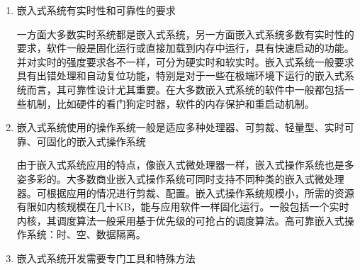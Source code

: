 \begin{enumerate}
\item 嵌{\cf}入式{\cf}系统{\cf}有实{\cf}时性{\cf}和可{\cf}靠性{\cf}的要{\cf}求

一{\cf}方面{\cf}大多{\cf}数实{\cf}时系{\cf}统都{\cf}是嵌{\cf}入式{\cf}系统{\cf}，另{\cf}一方{\cf}面嵌{\cf}入式{\cf}系统{\cf}多数{\cf}有实{\cf}时性{\cf}的要{\cf}求，{\cf}软件{\cf}一般{\cf}是固{\cf}化运{\cf}行或{\cf}直接{\cf}加载{\cf}到内{\cf}存中{\cf}运行{\cf}，具{\cf}有快{\cf}速启{\cf}动的{\cf}功能{\cf}。并{\cf}对实{\cf}时的{\cf}强度{\cf}要求{\cf}各不{\cf}一样{\cf}，可{\cf}分为{\cf}硬实{\cf}时和{\cf}软实{\cf}时。{\cf}嵌入{\cf}式系{\cf}统一{\cf}般要{\cf}求具{\cf}有出{\cf}错处{\cf}理和{\cf}自动{\cf}复位{\cf}功能{\cf}，特{\cf}别是{\cf}对于{\cf}一些{\cf}在极{\cf}端环{\cf}境下{\cf}运行{\cf}的嵌{\cf}入式{\cf}系统{\cf}而言{\cf}，其{\cf}可靠{\cf}性设{\cf}计尤{\cf}其重{\cf}要。{\cf}在大{\cf}多数{\cf}嵌入{\cf}式系{\cf}统的{\cf}软件{\cf}中一{\cf}般都{\cf}包括{\cf}一些{\cf}机制{\cf}，比{\cf}如硬{\cf}件的{\cf}看门{\cf}狗定{\cf}时器{\cf}，软{\cf}件的{\cf}内存{\cf}保护{\cf}和重{\cf}启动{\cf}机制{\cf}。

\item 嵌{\cf}入式{\cf}系统{\cf}使用{\cf}的操{\cf}作系{\cf}统一{\cf}般是{\cf}适应{\cf}多种{\cf}处理{\cf}器、{\cf}可剪{\cf}裁、{\cf}轻量{\cf}型、{\cf}实时{\cf}可靠{\cf}、可{\cf}固化{\cf}的嵌{\cf}入式{\cf}操作{\cf}系统{\cf}

由{\cf}于嵌{\cf}入式{\cf}系统{\cf}应用{\cf}的特{\cf}点，{\cf}像嵌{\cf}入式{\cf}微处{\cf}理器{\cf}一样{\cf}，嵌{\cf}入式{\cf}操作{\cf}系统{\cf}也是{\cf}多姿{\cf}多彩{\cf}的。{\cf}大多{\cf}数商{\cf}业嵌{\cf}入式{\cf}操作{\cf}系统{\cf}可同{\cf}时支{\cf}持不{\cf}同种{\cf}类的{\cf}嵌入{\cf}式微{\cf}处理{\cf}器。{\cf}可根{\cf}据应{\cf}用的{\cf}情况{\cf}进行{\cf}剪裁{\cf}、配{\cf}置。{\cf}嵌入{\cf}式操{\cf}作系{\cf}统规{\cf}模小{\cf}，所{\cf}需的{\cf}资源{\cf}有限{\cf}如内{\cf}核规{\cf}模在{\cf}几十{\cf}KB{\cf}，能{\cf}与应{\cf}用软{\cf}件一{\cf}样固{\cf}化运{\cf}行。{\cf}一般{\cf}包括{\cf}一个{\cf}实时{\cf}内核{\cf}，其{\cf}调度{\cf}算法{\cf}一般{\cf}采用{\cf}基于{\cf}优先{\cf}级的{\cf}可抢{\cf}占的{\cf}调度{\cf}算法{\cf}。高{\cf}可靠{\cf}嵌入{\cf}式操{\cf}作系{\cf}统：{\cf}时、{\cf}空、{\cf}数据{\cf}隔离。

\item 嵌{\cf}入式{\cf}系统{\cf}开发{\cf}需要{\cf}专门{\cf}工具{\cf}和特{\cf}殊方{\cf}法


\end{enumerate}
